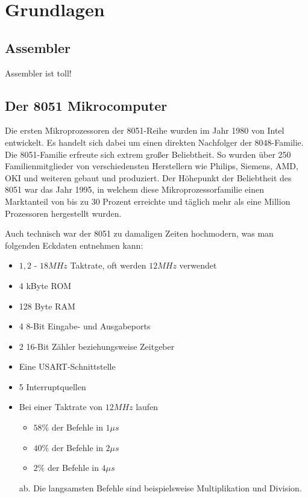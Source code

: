 \chapter{Grundlagen}

\section{Assembler}

Assembler ist toll!

\section{Der 8051 Mikrocomputer}

Die ersten Mikroprozessoren der 8051-Reihe wurden im Jahr 1980 von Intel entwickelt. Es handelt sich dabei um einen direkten Nachfolger der 8048-Familie.
Die 8051-Familie erfreute sich extrem großer Beliebtheit. So wurden über 250 Familienmitglieder von verschiedensten Herstellern wie Philips, Siemens, AMD, OKI und weiteren gebaut und produziert. Der Höhepunkt der Beliebtheit des 8051 war das Jahr 1995, in welchem diese Mikroprozessorfamilie einen Marktanteil von bis zu 30 Prozent erreichte und täglich mehr als eine Million Prozessoren hergestellt wurden. 

Auch technisch war der 8051 zu damaligen Zeiten hochmodern, was man folgenden Eckdaten entnehmen kann:
\begin{itemize}
  \item $1,2$ - $18 MHz$ Taktrate, oft werden $12 MHz$ verwendet
  \item 4 kByte ROM
  \item 128 Byte RAM
  \item 4 8-Bit Eingabe- und Ausgabeports
  \item 2 16-Bit Zähler beziehungsweise Zeitgeber
  \item Eine USART-Schnittstelle
  \item 5 Interruptquellen
  \item Bei einer Taktrate von $12 MHz$ laufen
    \begin{itemize}
      \item $58\%$ der Befehle in $1 \mu s$
      \item $40\%$ der Befehle in $2 \mu s$
      \item $2\%$ der Befehle in $4 \mu s$
    \end{itemize}
    ab. Die langsamsten Befehle sind beispielsweise Multiplikation und Division.
\end{itemize}


